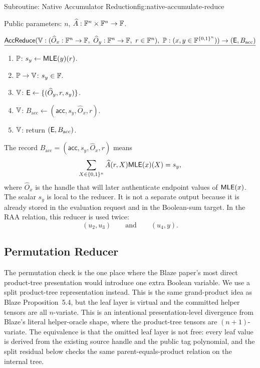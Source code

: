 \begin{protocolbox}{Subroutine: Native Accumulator Reduction}{fig:native-accumulate-reduce}
\scriptsize\raggedright
\noindent Public parameters: \(n\), \(\widehat A:\mathbb{F}^n\times\mathbb{F}^n\to\mathbb{F}\).

\smallskip
\noindent\(\underline{\AccReduce(\verifier:(\widehat O_x:\F^n\to\F,\ \widehat O_y:\F^n\to\F,\ r\in\F^n),\ \prover:(x,y\in\F^{\B^n}))\to(\EvalReqs,B_{\mathrm{acc}})}\)
\begin{enumerate}[leftmargin=0.24in,label=\textbf{A\arabic*.},itemsep=0.06em,topsep=0.06em,parsep=0pt]
  \item \(\mathbb{P}\): \(s_y\gets \mathsf{MLE}(y)(r)\).
  \item \(\mathbb{P}\to\mathbb{V}\): \(s_y\in\mathbb{F}\).
  \item \(\mathbb{V}\): \(\mathsf{E}\gets\{(\widehat O_y,r,s_y)\}\).
  \item \(\mathbb{V}\): \(B_{\mathrm{acc}}\gets(\mathsf{acc},s_y,\widehat O_x,r)\).
  \item \(\mathbb{V}\): return \((\mathsf{E},B_{\mathrm{acc}})\).
\end{enumerate}
\end{protocolbox}

The record \(B_{\mathrm{acc}}=(\mathsf{acc},s_y,\widehat O_x,r)\) means
\[
  \sum_{X\in\{0,1\}^n}\widehat A(r,X)\mathsf{MLE}(x)(X)=s_y,
\]
where \(\widehat O_x\) is the handle that will later authenticate endpoint
values of \(\mathsf{MLE}(x)\).  The scalar \(s_y\) is local to the reducer.  It is not a
separate output because it is already stored in the evaluation request and in
the Boolean-sum target.
In the RAA relation, this reducer is used twice:
\[
  (u_2,u_3)
  \qquad\text{and}\qquad
  (u_4,y).
\]

\subsection{Permutation Reducer}

The permutation check is the one place where the Blaze paper's most direct
product-tree presentation would introduce one extra Boolean variable.  We use a
split product-tree representation instead.  This is the same grand-product
idea as Blaze Proposition~5.4, but the leaf layer is virtual and the committed
helper tensors are all \(n\)-variate.  This is an intentional
presentation-level divergence from Blaze's literal helper-oracle shape, where
the product-tree tensors are \((n+1)\)-variate.  The equivalence is that the
omitted leaf layer is not free: every leaf value is derived from the existing
source handle and the public tag polynomial, and the split residual below
checks the same parent-equals-product relation on the internal tree.

